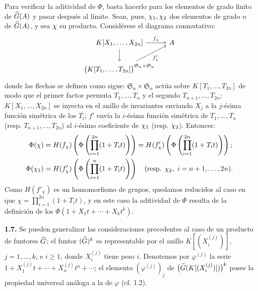 Para verificar la aditividad de \(\Phi\), basta hacerlo para los elementos de grado finito de \(\Ghat(A)\) y pasar después al límite. Sean, pues, \(\sisi{X_1}{\chi_1},\sisi{X_2}{\chi_2}\) dos elementos de grado \(n\) de \(\Ghat(A)\), y sea \(\sisi{X}{\chi}\) su producto. Considérese el diagrama conmutativo:
\[
\begin{tikzcd}[column sep=tiny]
K[X_1,\ldots,X_{2n}] \arrow[rr,"\sisi{f_X}{f_\chi}"] \arrow[d] && A\\
\bigl(K[T_1,\ldots,T_{2n}]\bigr)^{\mathfrak S_n\times\mathfrak S_n}
\arrow[urr,"\sisi{f'_X}{f'_\chi}"'] &&
\end{tikzcd}
\]
donde las flechas se definen como sigue: \(\mathfrak S_n\times\mathfrak S_n\) actúa sobre \(K[T_1,\ldots,T_{2n}]\) de modo que el primer factor permuta \(T_1,\ldots,T_n\) y el segundo \(T_{n+1},\ldots,T_{2n}\); \(K[X_1,\ldots,X_{2n}]\) se inyecta en el anillo de invariantes enviando \(X_j\) a la \(j\)-ésima función simétrica de los \(T_i\); \(f'\) envía la \(i\)-ésima función simétrica de \(T_1,\ldots,T_n\) (resp. \(T_{n+1},\ldots,T_{2n}\)) al \(i\)-ésimo coeficiente de \(\sisi{X_1}{\chi_1}\) (resp. \(\sisi{X_2}{\chi_2}\)). Entonces:
\[
\begin{aligned}
\Phi(\chi)
&=H(f_\chi)\left(\Phi\left(\prod_{i=1}^{2n}(1+T_it)\right)\right)
=H(f'_\chi)\left(\Phi\left(\prod_{i=1}^{2n}(1+T_it)\right)\right);\\
\Phi(\sisi{X_1}{\chi_1})
&=H(f'_\chi)\left(\Phi\left(\prod_{i=1}^{n}(1+T_it)\right)\right)\quad(\text{resp. }\sisi{X_2}{\chi_2},\ i=n+1,\ldots,2n).
\end{aligned}
\]
Como \(H(f'_\chi)\) es un homomorfismo de grupos, quedamos reducidos al caso en que \(\chi=\prod_{i=1}^{2n}(1+T_it)\), y en este caso la aditividad de \(\Phi\) resulta de la definición de los \(\Phi(1+X_1t+\cdots+X_k t^k)\).

\textbf{1.7.} Se pueden generalizar las consideraciones precedentes al caso de un producto de funtores \(\Ghat\); el funtor \((\Ghat)^k\) es representable por el anillo
\(K[(X_i^{(j)})]\), \(j=1,\ldots,k\), e \(i\geq 1\), donde \(X_i^{(j)}\) tiene peso \(i\). Denotemos por \(\varphi^{(j)}\) la serie \(1+X_1^{(j)}t+\cdots+X_n^{(j)}t^n+\cdots\); el elemento \((\varphi^{(j)})_j\) de \(\bigl(\Ghat(K[(X_i^{(j)})])\bigr)^k\) posee la propiedad universal análoga a la de \(\varphi\) (cf. 1.2).

